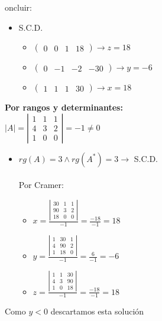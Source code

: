 \documentclass[spanish, 11pt]{exam}
\begin{document}
\begin{questions}
\begin{solution}
\begin{itemize}
oncluir:\begin{itemize}\item S.C.D.\begin{itemize}\item $\left(\begin{matrix}0 & 0 & 1 & 18\end{matrix}\right) \to z = 18$\end{itemize}\begin{itemize}\item $\left(\begin{matrix}0 & -1 & -2 & -30\end{matrix}\right) \to y = -6$\end{itemize}\begin{itemize}\item $\left(\begin{matrix}1 & 1 & 1 & 30\end{matrix}\right) \to x = 18$\end{itemize}\end{itemize}  \textbf{Por rangos y determinantes:} \\$\left|A\right|=\left|\begin{matrix}1 & 1 & 1\\4 & 3 & 2\\1 & 0 & 0\end{matrix}\right|=-1  \neq 0 $\begin{itemize} \item $rg(A)=3 \land rg(A^*)=3 \to $ S.C.D.  \\ \\ Por Cramer: \begin{itemize}\item $x=\frac{\left|\begin{matrix}30 & 1 & 1\\90 & 3 & 2\\18 & 0 & 0\end{matrix}\right|}{-1}=\frac{-18}{-1}=18$\item $y=\frac{\left|\begin{matrix}1 & 30 & 1\\4 & 90 & 2\\1 & 18 & 0\end{matrix}\right|}{-1}=\frac{6}{-1}=-6$\item $z=\frac{\left|\begin{matrix}1 & 1 & 30\\4 & 3 & 90\\1 & 0 & 18\end{matrix}\right|}{-1}=\frac{-18}{-1}=18$\end{itemize}\end{itemize}
        Como $y<0$ descartamos esta solución
        

\end{itemize}
\end{solution}
\end{questions}
\end{document}
